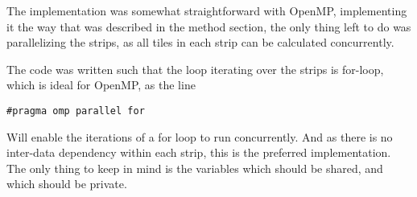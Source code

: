 The implementation was somewhat straightforward with OpenMP, implementing it the way that was described in the method section, the only thing left to do was parallelizing the strips, as all tiles in each strip can be calculated concurrently.

The code was written such that the loop iterating over the strips is for-loop, which is ideal for OpenMP, as the line
\begin{lstlisting}
#pragma omp parallel for
\end{lstlisting}
Will enable the iterations of a for loop to run concurrently. And as there is no inter-data dependency within each strip, this is the preferred implementation. The only thing to keep in mind is the variables which should be shared, and which should be private.
